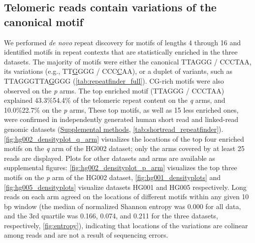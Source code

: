 \documentclass{article}
\begin{document}

\subsection*{Telomeric reads contain variations of the canonical motif}
We performed \textit{de novo} repeat discovery %
for motifs of lengths 4 through 16 and identified motifs in repeat contexts that are statistically enriched in the three datasets.
The majority of motifs were either the canonical TTAGGG / CCCTAA, its variations (e.g., TT\underline{G}GGG / CCC\underline{C}AA), or a duplet of variants, such as TTAGGGTTA\underline{G}GGG (\autoref{tab:repeatfinder_full}).
CG-rich motifs were also observed on the \textit{p} arms.
The top enriched motif (TTAGGG / CCCTAA) explained 43.3\%\textendash{}54.4\% of the telomeric repeat content on the \textit{q} arms, and 10.0\%\textendash{}22.7\% on the \textit{p} arms, %
These top motifs, as well as 15 less enriched ones, were confirmed in independently generated human short read and linked-read genomic datasets (\hyperref[sec:supp_methods]{Supplemental methods}, \autoref{tab:shortread_repeatfinder}). %
\autoref{fig:hg002_densityplot_q_arm} visualizes the locations of the top four enriched motifs on the \textit{q} arm of the HG002 dataset; only the arms covered by at least 25 reads are displayed. %
Plots for other datasets and arms are available as supplemental figures: \autoref{fig:hg002_densityplot_p_arm} visualizes the top three motifs on the \textit{p} arm of the HG002 dataset, \autoref{fig:hg001_densityplots} and \autoref{fig:hg005_densityplots} visualize datasets HG001 and HG005 respectively. %
Long reads on each arm agreed on the locations of different motifs within any given 10 bp window (the median of normalized Shannon entropy was 0.000 for all data, and the 3rd quartile was 0.166, 0.074, and 0.211 for the three datasets, respectively, \autoref{fig:entropy}), indicating that locations of the variations are colinear among reads and are not a result of sequencing errors. %
\end{document}
